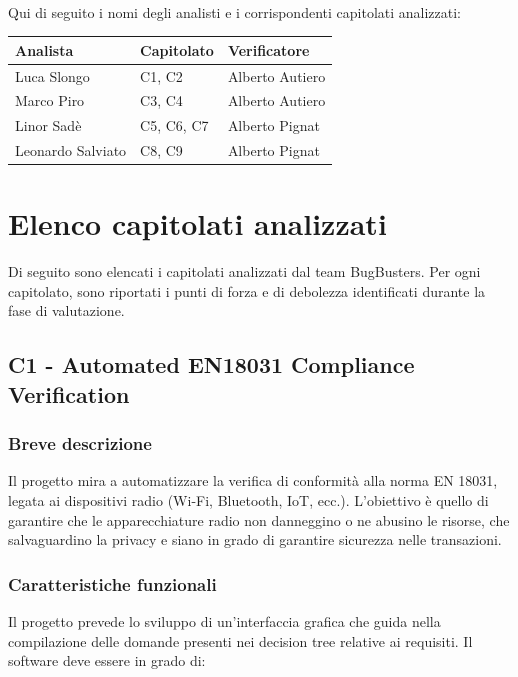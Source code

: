 \documentclass[a4paper,11pt]{article}
\begin{document}
\paragraph{}
Qui di seguito i nomi degli analisti e i corrispondenti capitolati analizzati:

\begin{tabularx}{\textwidth}{|X|X|X|}
\hline
\rowcolor{lightgray!40}
\textbf{Analista} & \textbf{Capitolato} & \textbf{Verificatore} \\
\hline
Luca Slongo & C1, C2 & Alberto Autiero\\ 
\hline
Marco Piro & C3, C4 & Alberto Autiero \\ 
\hline
Linor Sadè & C5, C6, C7 & Alberto Pignat\\ 
\hline
Leonardo Salviato & C8, C9 & Alberto Pignat\\ 
\hline
\end{tabularx}

\newpage
\section{Elenco capitolati analizzati}
\label{sec:elenco_capitolati}
Di seguito sono elencati i capitolati analizzati dal team BugBusters. Per ogni capitolato, sono riportati i punti di forza e di debolezza identificati durante la fase di valutazione.

\newpage
\subsection{C1 - Automated EN18031 Compliance Verification}
\subsubsection{Breve descrizione}
Il progetto mira a automatizzare la verifica di conformità alla norma EN 18031, legata ai dispositivi radio (Wi-Fi, Bluetooth, IoT, ecc.). L'obiettivo è quello di garantire che le apparecchiature radio non danneggino o ne abusino le risorse, che salvaguardino la privacy e siano in grado di garantire sicurezza nelle transazioni.
\subsubsection{Caratteristiche funzionali}
Il progetto prevede lo sviluppo di un'interfaccia grafica che guida nella compilazione delle domande presenti nei decision tree relative ai requisiti.  
Il software deve essere in grado di:
\end{document}
